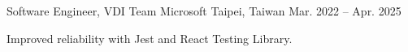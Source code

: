 \resumeExperience
  {Software Engineer, VDI Team}
  {Microsoft}
  {Taipei, Taiwan}
  {Mar. 2022 -- Apr. 2025}
  {
    \item Improved reliability with Jest and React Testing Library.
  }
